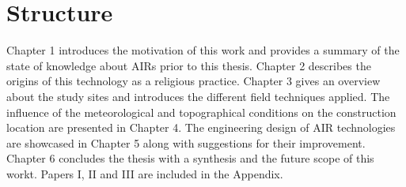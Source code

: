 \section{Structure}

Chapter 1 introduces the motivation of this work and provides a summary of the state of knowledge about AIRs
prior to this thesis. Chapter 2 describes the origins of this technology as a religious practice. Chapter 3
gives an overview about the study sites and introduces the different field techniques applied. The influence of
the meteorological and topographical conditions on the construction location are presented in Chapter 4. The
engineering design of AIR technologies are showcased in Chapter 5 along with suggestions for their improvement.
Chapter 6 concludes the thesis with a synthesis and the future scope of this workt. Papers I, II and III are included in the
Appendix.


